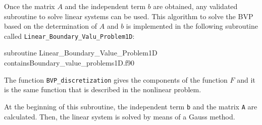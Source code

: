  Once the matrix $ A $ and the independent term $ b$ are obtained, any validated subroutine to solve linear systems can be used.
 This algorithm to solve the BVP based on the determination of $ A $ and $ b $ is implemented in the following subroutine called  
\verb|Linear_Boundary_Valu_Problem1D|: 
 
 
 
 
 \newpage 
 
   
                      \vspace{1cm} 
                      {subroutine Linear_Boundary_Value_Problem1D}
                      {contains}{Boundary_value_problems1D.f90}
                      
 The function \verb|BVP_discretization| gives the components of the function $ F $ and it is the same  function that is  described in the nonlinear problem. 
 
 At the beginning of this subroutine, 
 the independent term \verb|b| and the matrix \verb|A| are  calculated. 
 Then, the linear system is solved by means of a Gauss method. 
 
        
               
        
        
        
       
        
        
